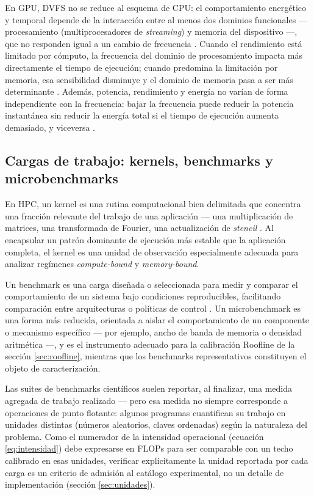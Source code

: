 \documentclass[12pt,oneside,spanish]{book}
\begin{document}
En GPU, DVFS no se reduce al esquema de CPU: el comportamiento energético y temporal depende de la interacción entre al menos dos dominios funcionales --- procesamiento (multiprocesadores de \textit{streaming}) y memoria del dispositivo ---, que no responden igual a un cambio de frecuencia \cite{Guerreiro2019}. Cuando el rendimiento está limitado por cómputo, la frecuencia del dominio de procesamiento impacta más directamente el tiempo de ejecución; cuando predomina la limitación por memoria, esa sensibilidad disminuye y el dominio de memoria pasa a ser más determinante \cite{Guerreiro2019,Ali2023}. Además, potencia, rendimiento y energía no varían de forma independiente con la frecuencia: bajar la frecuencia puede reducir la potencia instantánea sin reducir la energía total si el tiempo de ejecución aumenta demasiado, y viceversa \cite{Guerreiro2019,Ali2023}.

\subsection{Cargas de trabajo: kernels, benchmarks y microbenchmarks}

En HPC, un kernel es una rutina computacional bien delimitada que concentra una fracción relevante del trabajo de una aplicación --- una multiplicación de matrices, una transformada de Fourier, una actualización de \textit{stencil} \cite{SDKernel2026}. Al encapsular un patrón dominante de ejecución más estable que la aplicación completa, el kernel es una unidad de observación especialmente adecuada para analizar regímenes \textit{compute-bound} y \textit{memory-bound}.

Un benchmark es una carga diseñada o seleccionada para medir y comparar el comportamiento de un sistema bajo condiciones reproducibles, facilitando comparación entre arquitecturas o políticas de control \cite[Ch.~12]{Gregg2020}. Un microbenchmark es una forma más reducida, orientada a aislar el comportamiento de un componente o mecanismo específico --- por ejemplo, ancho de banda de memoria o densidad aritmética \cite[Ch.~12]{Gregg2020} ---, y es el instrumento adecuado para la calibración Roofline de la sección \ref{sec:roofline}, mientras que los benchmarks representativos constituyen el objeto de caracterización.

Las suites de benchmarks científicos suelen reportar, al finalizar, una medida agregada de trabajo realizado --- pero esa medida no siempre corresponde a operaciones de punto flotante: algunos programas cuantifican su trabajo en unidades distintas (números aleatorios, claves ordenadas) según la naturaleza del problema. Como el numerador de la intensidad operacional (ecuación \eqref{eq:intensidad}) debe expresarse en FLOPs para ser comparable con un techo calibrado en esas unidades, verificar explícitamente la unidad reportada por cada carga es un criterio de admisión al catálogo experimental, no un detalle de implementación (sección \ref{sec:unidades}).
\end{document}
